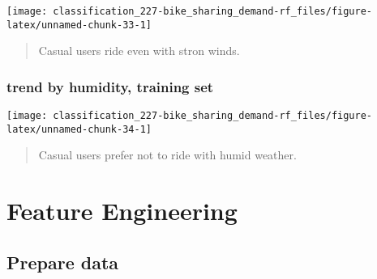 \documentclass[]{book}
\newenvironment{Shaded}{\begin{snugshade}}{\end{snugshade}}
\newcommand{\DataTypeTok}[1]{\textcolor[rgb]{0.13,0.29,0.53}{#1}}
\newcommand{\DecValTok}[1]{\textcolor[rgb]{0.00,0.00,0.81}{#1}}
\newcommand{\KeywordTok}[1]{\textcolor[rgb]{0.13,0.29,0.53}{\textbf{#1}}}
\newcommand{\NormalTok}[1]{#1}
\newcommand{\OperatorTok}[1]{\textcolor[rgb]{0.81,0.36,0.00}{\textbf{#1}}}
\newcommand{\StringTok}[1]{\textcolor[rgb]{0.31,0.60,0.02}{#1}}
\begin{document}
\begin{center}\texttt{[image: classification\_227-bike\_sharing\_demand-rf\_files/figure-latex/unnamed-chunk-33-1]} \end{center}

\begin{quote}
Casual users ride even with stron winds.
\end{quote}

\hypertarget{trend-by-humidity-training-set}{%
\subsubsection{trend by humidity, training set}\label{trend-by-humidity-training-set}}

\begin{Shaded}
\end{Shaded}

\begin{center}\texttt{[image: classification\_227-bike\_sharing\_demand-rf\_files/figure-latex/unnamed-chunk-34-1]} \end{center}

\begin{quote}
Casual users prefer not to ride with humid weather.
\end{quote}

\hypertarget{feature-engineering}{%
\section{Feature Engineering}\label{feature-engineering}}

\hypertarget{prepare-data-1}{%
\subsection{Prepare data}\label{prepare-data-1}}
\end{document}
